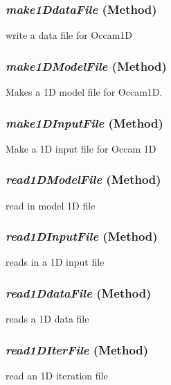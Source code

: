 \subsubsection{\textit{make1DdataFile} (Method)}
\label{sssec:.modeling.occamtools.Occam1D.make1DdataFile}

write a data file for Occam1D

\subsubsection{\textit{make1DModelFile} (Method)}
\label{sssec:.modeling.occamtools.Occam1D.make1DModelFile}

Makes a 1D model file for Occam1D.  

\subsubsection{\textit{make1DInputFile} (Method)}
\label{sssec:.modeling.occamtools.Occam1D.make1DInputFile}

Make a 1D input file for Occam 1D

\subsubsection{\textit{read1DModelFile} (Method)}
\label{sssec:.modeling.occamtools.Occam1D.read1DModelFile}

read in model 1D file

\subsubsection{\textit{read1DInputFile} (Method)}
\label{sssec:.modeling.occamtools.Occam1D.read1DInputFile}

reads in a 1D input file

\subsubsection{\textit{read1DdataFile} (Method)}
\label{sssec:.modeling.occamtools.Occam1D.read1DdataFile}

reads a 1D data file

\subsubsection{\textit{read1DIterFile} (Method)}
\label{sssec:.modeling.occamtools.Occam1D.read1DIterFile}

read an 1D iteration file
        


